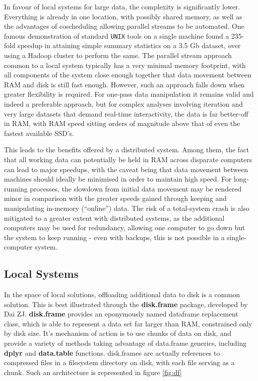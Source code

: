 In favour of local systems for large data, the complexity is significantly lower.
Everything is already in one location, with possibly shared memory, as well as the advantages of coscheduling allowing parallel streams to be automated.
One famous demonstration of standard \texttt{UNIX} tools on a single machine found a 235-fold speedup in attaining simple summary statistics on a 3.5 Gb dataset, over using a Hadoop cluster to perform the same\cite{drake2014cltvscluster}.
The parallel stream approach common to a local system typically has a very minimal memory footprint, with all components of the system close enough together that data movement between RAM and disk is still fast enough.
However, such an approach falls down when greater flexibility is required.
For one-pass data manipulation it remains valid and indeed a preferable approach, but for complex analyses involving iteration and very large datasets that demand real-time interactivity, the data is far better-off in RAM, with RAM speed sitting orders of magnitude above that of even the fastest available SSD's\cite{kim201923}\cite{samsung2020SSD}.

This leads to the benefits offered by a distributed system.
Among them, the fact that all working data can potentially be held in RAM across disparate computers can lead to major speedups, with the caveat being that data movement between machines should ideally be minimised in order to maintain high speed.
For long-running processes, the slowdown from initial data movement may be rendered minor in comparison with the greater speeds gained through keeping and manipulating in-memory (``online'') data\cite{emmerich2000engineering}.
The risk of a total-system crash is also mitigated to a greater extent with distributed systems, as the additional computers may be used for redundancy, allowing one computer to go down but the system to keep running - even with backups, this is not possible in a single-computer system.

\subsection{Local Systems}

In the space of local solutions, offloading additional data to disk is a common solution.
This is best illustrated through the \textbf{disk.frame} package, developed by Dai ZJ.
\textbf{disk.frame} provides an eponymously named dataframe replacement class, which is able to represent a data  set far larger than RAM, constrained only by disk size\cite{zj20}.
It's mechanism of action is to use chunks of data on disk, and provide a variety of methods taking advantage of data.frame generics, including \textbf{dplyr} and \textbf{data.table} functions.
disk.frames are actually references to compressed files in a filesystem directory on disk, with each file serving as a chunk.
Such an architecture is represented in figure \ref{fig:df}

